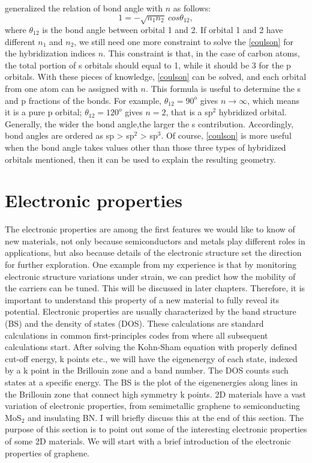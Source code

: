 \citet{coulson1949} generalized the relation of bond angle with $n$ as follows:
\begin{equation}\label{coulson}
1=-\sqrt{n_1n_2}~cos\theta_{12}, 
\end{equation}
where $\theta_{12}$ is the bond angle between orbital 1 and 2. If orbital 1 and 2 have different $n_1$ and $n_2$, we still need one more constraint to solve the \autoref{coulson} for the hybridization indices $n$. This constraint is that, in the case of carbon atoms, the total portion of s orbitals should equal to 1, while it should be 3 for the p orbitals. With these pieces of knowledge, \autoref{coulson} can be solved, and each orbital from one atom can be assigned with $n$. This formula is useful to determine the s and p fractions of the bonds. For example, $\theta_{12}=90^o$ gives $n\rightarrow\infty$, which means it is a pure p orbital; $\theta_{12}=120^o$ gives $n=2$, that is a sp$^2$ hybridized orbital. Generally, the wider the bond angle,the larger the s contribution. Accordingly, bond angles are ordered as sp > sp$^2$ > sp$^3$. Of course, \autoref{coulson} is more useful when the bond angle takes values other than those three types of hybridized orbitals mentioned, then it can be used to explain the resulting geometry.

\section{Electronic properties}

The electronic properties are among the first features we would like to know of new materials, not only because semiconductors and metals play different roles in applications, but also because details of the electronic structure set the direction for further exploration. One example from my experience is that by monitoring electronic structure variations under strain, we can predict how the mobility of the carriers can be tuned. This will be discussed in later chapters. Therefore, it is important to understand this property of a new material to fully reveal its potential. Electronic properties are usually characterized by the band structure (BS) and the density of states (DOS). These calculations are standard calculations in common first-principles codes from where all subsequent calculations start. After solving the Kohn-Sham equation with properly defined cut-off energy, k points etc., we will have the eigenenergy of each state, indexed by a k point in the Brillouin zone and a band number.  The DOS counts such states at a specific energy. The BS is the plot of the eigenenergies along lines in the Brillouin zone that connect high symmetry k points.  2D materials have a vast variation of electronic properties, from semimetallic graphene to semiconducting MoS$_2$ and insulating BN. I will briefly discuss this at the end of this section. The purpose of this section is to point out some of the interesting electronic properties of some 2D materials. We will start with a brief introduction of the electronic properties of graphene.

